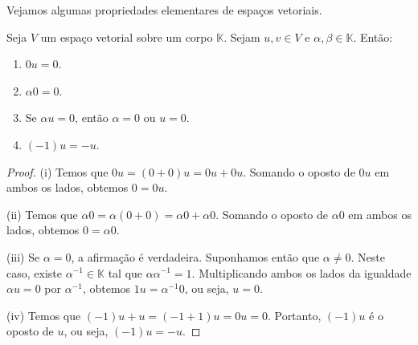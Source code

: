 Vejamos algumas propriedades elementares de espaços vetoriais.

\begin{proposition}
    Seja $V$ um espaço vetorial sobre um corpo $\mathbb K$.
    Sejam $u, v \in V$ e $\alpha, \beta \in \mathbb K$. Então:
    \begin{enumerate}[label=(\roman*)]
        \item $0 u = 0$.
        \item $\alpha 0 = 0$.
        \item Se $\alpha u = 0$, então $\alpha = 0$ ou $u = 0$.
        \item $(-1)u = -u$.
    \end{enumerate}
\end{proposition}
\begin{proof}
    (i) Temos que $0 u = (0 + 0)u = 0 u + 0 u$.
    Somando o oposto de $0 u$ em ambos os lados, obtemos $0 = 0 u$.

    (ii) Temos que $\alpha 0 = \alpha(0 + 0) = \alpha 0 + \alpha 0$.
    Somando o oposto de $\alpha 0$ em ambos os lados, obtemos $0 = \alpha 0$.

    (iii) Se $\alpha = 0$, a afirmação é verdadeira.
    Suponhamos então que $\alpha \neq 0$.
    Neste caso, existe $\alpha^{-1} \in \mathbb K$ tal que $\alpha \alpha^{-1} = 1$.
    Multiplicando ambos os lados da igualdade $\alpha u = 0$ por $\alpha^{-1}$, obtemos $1 u = \alpha^{-1} 0$, ou seja, $u = 0$.

    (iv) Temos que $(-1)u + u = (-1 + 1)u = 0 u = 0$.
    Portanto, $(-1)u$ é o oposto de $u$, ou seja, $(-1)u = -u$.
\end{proof}